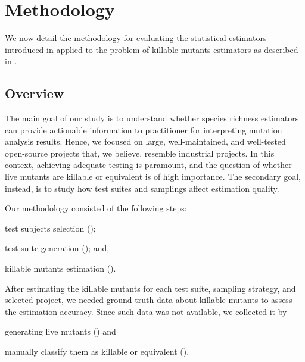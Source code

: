 \documentclass[sigconf,review,anonymous]{acmart}
\begin{document}

\section{Methodology}
We now detail the methodology for evaluating 
the statistical estimators introduced in 
applied to the problem of killable mutants estimators as 
described in .

\subsection{Overview}
\label{sec:overview}
The main goal of our study is to understand whether species richness
estimators can provide actionable information to %
practitioner for interpreting mutation analysis results. 
%
Hence, we focused on large, well-maintained, and well-tested open-source projects
that, we believe, resemble %
industrial projects. In this context, achieving adequate testing is paramount, 
and the question of whether live mutants are killable or equivalent is of high importance. 
%
The secondary goal, instead, is to study how test suites and samplings affect
estimation quality.

Our methodology consisted of the following steps:
\begin{enumerate*}[label=(\arabic*)]
    \item test subjects selection ();
    \item test suite generation ();
    and, \item killable mutants estimation ().
\end{enumerate*}
%
After estimating the killable mutants for each test suite, sampling strategy, and selected project,
we needed ground truth data about killable mutants
to assess the estimation accuracy. %
%
Since such data was not available, %
we collected it by 
\begin{enumerate*}[label=(\arabic*),start=4]   
     \item generating live mutants () and
     \item manually classify them as killable or equivalent ().
\end{enumerate*}
\end{document}
